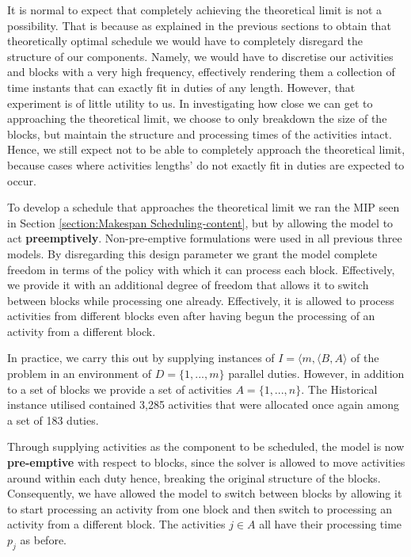 \vspace{\baselineskip}
\noindent
It is normal to expect that completely achieving the theoretical limit is not a possibility. That is because as explained in the previous sections to obtain that theoretically optimal schedule we would have to completely disregard the structure of our components. Namely, we would have to discretise our activities and blocks with a very high frequency, effectively rendering them a collection of time instants that can exactly fit in duties of any length. However, that experiment is of little utility to us. In investigating how close we can get to approaching the theoretical limit, we choose to only breakdown the size of the blocks, but maintain the structure and processing times of the activities intact. Hence, we still expect not to be able to completely approach the theoretical limit, because cases where activities lengths' do not exactly fit in duties are expected to occur.  


\vspace{\baselineskip}
\noindent
To develop a schedule that approaches the theoretical limit we ran the MIP seen in Section \ref{section:Makespan Scheduling-content}, but by allowing the model to act \textbf{preemptively}. Non-pre-emptive formulations were used in all previous three models. By disregarding this design parameter we grant the model complete freedom in terms of the policy with which it can process each block. Effectively, we provide it with an additional degree of freedom that allows it to switch between blocks while processing one already. Effectively, it is allowed to process activities from different blocks even after having begun the processing of an activity from a different block. 

\vspace{\baselineskip}
\noindent
In practice, we carry this out by supplying instances of $I = \langle{m},\langle{B},A\rangle{}$ of the problem in an environment of $D=\{1,...,m\}$ parallel duties. However, in addition to a set of blocks we provide a set of activities $A =\{1,...,n\}$. The Historical instance utilised contained 3,285 activities that were allocated once again among a set of 183 duties. 

\vspace{\baselineskip}
\noindent
Through supplying activities as the component to be scheduled, the model is now \textbf{pre-emptive} with respect to blocks, since the solver is allowed to move activities around within each duty hence, breaking the original structure of the blocks. Consequently, we have allowed the model to switch between blocks by allowing it to start processing an activity from one block and then switch to processing an activity from a different block. The activities $j \in A$ all have their processing time $p_{j}$ as before. 

